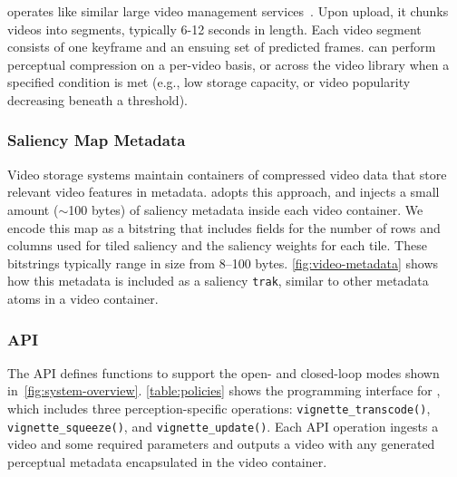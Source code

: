 \nameStore operates like similar large video management services~\cite{vbench, huang2017sve, netflix2018shotbased}.
Upon upload, it chunks videos into segments, typically 6-12 seconds in length.
Each video segment consists of one keyframe and an ensuing set of predicted frames.
\nameStore can perform perceptual compression on a per-video basis, or across the video library when a specified condition is met (e.g., low storage capacity, or video popularity decreasing beneath a threshold).

\subsubsection{Saliency Map Metadata}
\label{sec:system:metadata}

Video storage systems maintain containers of compressed video data that store relevant video features in metadata.
\nameStore adopts this approach, and injects a small amount ($\sim$100 bytes) of saliency metadata inside each video container.
We encode this map as a bitstring that includes fields for the number of rows and columns used for tiled saliency and the saliency weights for each tile.
These bitstrings typically range in size from 8--100 bytes.
\ref{fig:video-metadata} shows how this metadata is included as a saliency \texttt{trak}, similar to other metadata atoms in a video container.

\videoMetadataFigure

\subsubsection{\nameStore API}
\label{sec:system:interface}


The \nameStore API defines functions to support the open- and closed-loop modes shown in~\ref{fig:system-overview}.
\ref{table:policies} shows the programming interface for \name, which includes three perception-specific operations: \texttt{vignette\_transcode()}, \texttt{vignette\_squeeze()}, and \texttt{vignette\_update()}.
Each API operation ingests a video and some required parameters and outputs a video with any generated perceptual metadata encapsulated in the video container.

